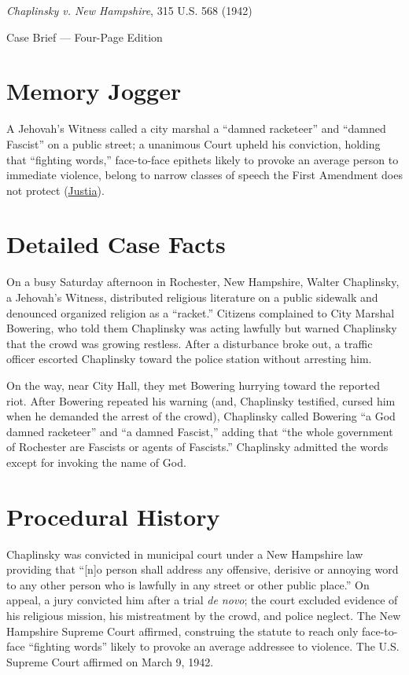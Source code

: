 \documentclass[12pt]{article}
\begin{document}
\begin{center}
{\LARGE \textit{Chaplinsky v. New Hampshire}, 315 U.S. 568 (1942)\par}
\vspace{0.8em}
{\large Case Brief --- Four-Page Edition\par}
\end{center}
\vspace{1em}

\section{Memory Jogger}

A Jehovah's Witness called a city marshal a ``damned racketeer'' and ``damned Fascist'' on a public street; a unanimous Court upheld his conviction, holding that ``fighting words,'' face-to-face epithets likely to provoke an average person to immediate violence, belong to narrow classes of speech the First Amendment does not protect (\href{https://supreme.justia.com/cases/federal/us/315/568/}{Justia}).

\section{Detailed Case Facts}

On a busy Saturday afternoon in Rochester, New Hampshire, Walter Chaplinsky, a Jehovah's Witness, distributed religious literature on a public sidewalk and denounced organized religion as a ``racket.'' Citizens complained to City Marshal Bowering, who told them Chaplinsky was acting lawfully but warned Chaplinsky that the crowd was growing restless. After a disturbance broke out, a traffic officer escorted Chaplinsky toward the police station without arresting him.

On the way, near City Hall, they met Bowering hurrying toward the reported riot. After Bowering repeated his warning (and, Chaplinsky testified, cursed him when he demanded the arrest of the crowd), Chaplinsky called Bowering ``a God damned racketeer'' and ``a damned Fascist,'' adding that ``the whole government of Rochester are Fascists or agents of Fascists.'' Chaplinsky admitted the words except for invoking the name of God.

\section{Procedural History}

Chaplinsky was convicted in municipal court under a New Hampshire law providing that ``[n]o person shall address any offensive, derisive or annoying word to any other person who is lawfully in any street or other public place.'' On appeal, a jury convicted him after a trial \textit{de novo}; the court excluded evidence of his religious mission, his mistreatment by the crowd, and police neglect. The New Hampshire Supreme Court affirmed, construing the statute to reach only face-to-face ``fighting words'' likely to provoke an average addressee to violence. The U.S. Supreme Court affirmed on March 9, 1942.
\end{document}
